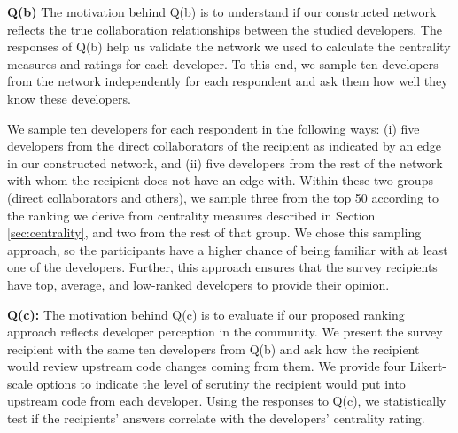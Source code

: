 \documentclass[10pt,journal,compsoc]{IEEEtran}
\begin{document}
    \indent  \textbf{Q(b)} The motivation behind Q(b) is to understand if our constructed network reflects the true collaboration relationships between the studied developers. The responses of Q(b) help us validate the network we used to calculate the centrality measures and ratings for each developer. To this end, we sample ten developers from the network independently for each respondent and ask them how well they know these developers. 

    We sample ten developers for each respondent in the following ways: (i) five developers from the direct collaborators of the recipient as indicated by an edge in our constructed network, and (ii) five developers from the rest of the network with whom the recipient does not have an edge with. Within these two groups (direct collaborators and others), we sample three from the top 50 according to the ranking we derive from centrality measures described in Section \ref{sec:centrality}, and two from the rest of that group. We chose this sampling approach, so the participants have a higher chance of being familiar with at least one of the developers. Further, this approach ensures that the survey recipients have top, average, and low-ranked developers to provide their opinion.


    \indent  \textbf{Q(c):} The motivation behind Q(c) is to evaluate if our proposed ranking approach reflects developer perception in the community. We present the survey recipient with the same ten developers from Q(b) and ask how the recipient would review upstream code changes coming from them. We provide four Likert-scale options to indicate the level of scrutiny the recipient would put into upstream code from each developer. Using the responses to Q(c), we statistically test if the recipients' answers correlate with the developers' centrality rating. 
\end{document}
